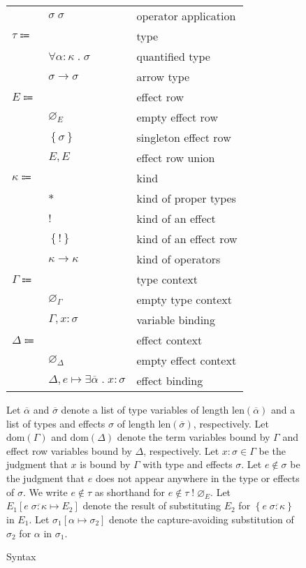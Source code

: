 \documentclass[12pt]{article}
\newcommand\parens[1]{\left( #1 \right)} %
\newcommand\lstof[1]{\overline{#1}}
\newcommand\lstlen[1]{\text{len}\parens{\lstof{#1}}}
\newcommand\evar{x}
\newcommand\ttype{\tau}
\newcommand\tvar{\alpha}
\newcommand\tarrow[2]{#1 \rightarrow #2} %
\newcommand\ttforall[2]{\forall #1 \; . \; #2} %
\newcommand\tx{\sigma}
\newcommand\twithx[2]{#1 \; ! \; #2} %
\newcommand\tanno[2]{#1 : #2} %
\newcommand\tsub[3]{#1 \left[ #2 \mapsto #3 \right]} %
\newcommand\ttapp[2]{#1 \; #2} %
\newcommand\xeffects{E}
\newcommand\xempty{\varnothing_{\xeffects}}
\newcommand\xtapp[2]{#1 \; #2} %
\newcommand\xsingleton[1]{\left\{ #1 \right\}}
\newcommand\xunion[2]{#1, #2}
\newcommand\xeffect{e}
\newcommand\xnotint[2]{#1 \notin #2} %
\newcommand\xsub[3]{#1 \left[ #2 \mapsto #3 \right]} %
\newcommand\ccontext{\Gamma}
\newcommand\cempty{\varnothing_{\ccontext}}
\newcommand\cextend[2]{#1, #2}
\newcommand\cdom[1]{\text{dom}\parens{#1}}
\newcommand\dcontext{\Delta}
\newcommand\dempty{\varnothing_{\dcontext}}
\newcommand\dextend[2]{#1, #2}
\newcommand\deffect[4]{#1 \mapsto \exists #2 \; . \; \tanno{#3}{#4}} %
\newcommand\ddom[1]{\text{dom}\parens{#1}}
\newcommand\kkind{\kappa}
\newcommand\ktype{*}
\newcommand\keffect{!}
\newcommand\keffectset{\left\{ ! \right\}} %
\newcommand\karrow[2]{#1 \rightarrow #2} %
\begin{document}
\begin{figure}
\begin{mdframed}[backgroundcolor=none]
\begin{center}
\begin{tabular}{l l l}
          & $\ttapp{\tx}{\tx}$ & operator application \\
          $\ttype \Coloneqq$ & & type \\
          & $\ttforall{\tanno{\tvar}{\kkind}}{\tx}$ & quantified type \\
          & $\tarrow{\tx}{\tx}$ & arrow type \\
          $\xeffects \Coloneqq$ & & effect row \\
          & $\xempty$ & empty effect row \\
          & $\xsingleton{\tx}$ & singleton effect row \\
          & $\xunion{\xeffects}{\xeffects}$ & effect row union \\
          $\kkind \Coloneqq $ & & kind \\
          & $\ktype$ & kind of proper types \\
          & $\keffect$ & kind of an effect \\
          & $\keffectset$ & kind of an effect row \\
          & $\karrow{\kkind}{\kkind}$ & kind of operators \\
          $\ccontext \Coloneqq$ & & type context \\
          & $\cempty$ & empty type context \\
          & $\cextend{\ccontext}{\tanno{\evar}{\tx}}$ & variable binding \\
          $\dcontext \Coloneqq$ & & effect context \\
          & $\dempty$ & empty effect context \\
          & $\dextend{\dcontext}{\deffect{\xeffect}{\lstof{\tvar}}{\evar}{\tx}}$ & effect binding \\
        \end{tabular}
      \end{center}

      \bigskip

      Let $\lstof{\tvar}$ and $\lstof{\tx}$ denote a list of type variables of length $\lstlen{\tvar}$ and a list of types and effects $\tx$ of length $\lstlen{\tx}$, respectively. Let $\cdom{\ccontext}$ and $\ddom{\dcontext}$ denote the term variables bound by $\ccontext$ and effect row variables bound by $\dcontext$, respectively. Let $\tanno{\evar}{\tx} \in \ccontext$ be the judgment that $\evar$ is bound by $\ccontext$ with type and effects $\tx$. Let $\xnotint{\xeffect}{\tx}$ be the judgment that $\xeffect$ does not appear anywhere in the type or effects of $\tx$. We write $\xnotint{\xeffect}{\ttype}$ as shorthand for $\xnotint{\xeffect}{\twithx{\ttype}{\xempty}}$. Let $\xsub{\xeffects_1}{\xtapp{\xeffect}{\lstof{\tanno{\tx}{\kkind}}}}{\xeffects_2}$ denote the result of substituting $\xeffects_2$ for $\xsingleton{\xtapp{\xeffect}{\lstof{\tanno{\tx}{\kkind}}}}$ in $\xeffects_1$. Let $\tsub{\tx_1}{\tvar}{\tx_2}$ denote the capture-avoiding substitution of $\tx_2$ for $\tvar$ in $\tx_1$.

      \caption{Syntax}\label{fig:syntax}
    \end{mdframed}
  \end{figure}
\end{document}
